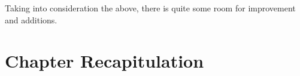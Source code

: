 \documentclass[thesis-solanki.tex]{subfiles}
\begin{document}
Taking into consideration the above, there is quite some room for improvement and additions.


\section{Chapter Recapitulation}


\ifMain
\begin{scope}
  \nolinenumbers
  \enotesize
  \par
  \begin{singlespace}
  \setlength{\parskip}{12pt plus 2pt minus 1pt}
  \theendnotes
  \par
  \end{singlespace}
\end{scope}
\fi
\end{document}
